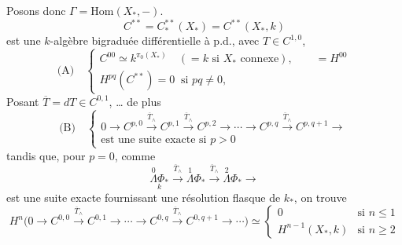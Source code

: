 \documentclass[11pt,a4paper]{article}
\begin{document}
Posons donc $\Gamma = \mathrm{Hom}(X_*, -)$.
\[
  C^{**} = C^{**}_*(X_*) = C^{**}(X_*, k)
\]
est une $k$-algèbre bigraduée différentielle à p.d., avec 
 $T \in C^{1,0}$,
\[
  \text{(A)} \quad
  \left\{\begin{array}{l}
    C^{00} \simeq k^{\pi_0(X_*)} \quad (= k \text{ si } X_* \text{ connexe}),
    \qquad = H^{00} \\
    H^{pq}(C^{**}) = 0 \ \text{ si } pq \neq 0,
  \end{array}\right.
\]
Posant $\overline{T} = dT \in C^{0,1}$, \ldots{} de plus
\[
  \text{(B)} \quad
  \left\{\begin{array}{l}
    0 \to C^{p,0} \xrightarrow{\overline{T}_\wedge} C^{p,1} \xrightarrow{\overline{T}_\wedge} C^{p,2} \to \cdots
    \to C^{p,q} \xrightarrow{\overline{T}_\wedge} C^{p,q+1} \to \\
    \text{est une suite exacte si } p > 0
  \end{array}\right.
\]
tandis que, pour $p = 0$, comme
\[
  \underset{\textstyle k}{\overset{0}{\Lambda} \Phi_*}
  \xrightarrow{\overline{T}_\wedge} \overset{1}{\Lambda} \Phi_*
  \xrightarrow{\overline{T}_\wedge} \overset{2}{\Lambda} \Phi_* \to
\]
est une suite exacte fournissant une résolution flasque de $k_*$, on trouve
\[
  H^n\bigl(0 \to C^{0,0} \xrightarrow{\overline{T}_\wedge} C^{0,1} \to \cdots \to
  C^{0,q} \xrightarrow{\overline{T}_\wedge} C^{0,q+1} \to \cdots\bigr)
  \simeq \left\{\begin{array}{ll}
    0 & \text{si } n \leq 1 \\
    H^{n-1}(X_*, k) & \text{si } n \geq 2
  \end{array}\right.
\]
\end{document}
